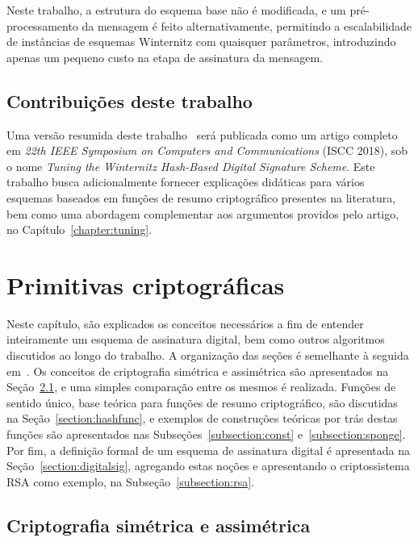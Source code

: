 \documentclass{ufsctex/ufsctex}
\begin{document}
Neste trabalho, a estrutura do esquema base não é modificada, e um
pré-processamento da mensagem é feito alternativamente, permitindo a
escalabilidade de instâncias de esquemas Winternitz com quaisquer parâmetros,
introduzindo apenas um pequeno custo na etapa de assinatura da mensagem.

\section{Contribuições deste trabalho}\label{section:contributions}

Uma versão resumida deste trabalho~\cite{Perin:inproc:2018:jun} será publicada
como um artigo completo em \emph{22th IEEE Symposium on Computers and
Communications} (ISCC 2018), sob o nome \emph{Tuning the Winternitz Hash-Based
Digital Signature Scheme}. Este trabalho busca adicionalmente fornecer
explicações didáticas para vários esquemas baseados em funções de resumo
criptográfico presentes na literatura, bem como uma abordagem complementar aos
argumentos providos pelo artigo, no Capítulo~\ref{chapter:tuning}.

\chapter{Primitivas criptográficas}\label{chapter:primitives}

Neste capítulo, são explicados os conceitos necessários a fim de entender
inteiramente um esquema de assinatura digital, bem como outros algoritmos
discutidos ao longo do trabalho. A organização das seções é semelhante à
seguida em~\cite[Capítulo 2]{Gathen:book:2015}. Os conceitos de criptografia
simétrica e assimétrica são apresentados na Seção~\ref{section:crypto}, e uma
simples comparação entre os mesmos é realizada. Funções de sentido único, base
teórica para funções de resumo criptográfico, são discutidas na
Seção~\ref{section:hashfunc}, e exemplos de construções teóricas por trás
destas funções são apresentados nas Subseções~\ref{subsection:const}
e~\ref{subsection:sponge}. Por fim, a definição formal de um esquema de
assinatura digital é apresentada na Seção~\ref{section:digitalsig}, agregando
estas noções e apresentando o criptossistema RSA como exemplo, na
Subseção~\ref{subsection:rsa}.

\section{Criptografia simétrica e assimétrica}\label{section:crypto}
\end{document}
